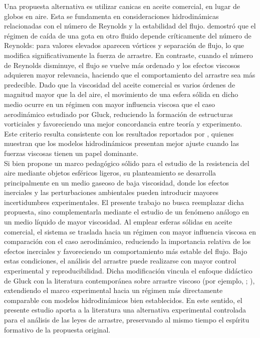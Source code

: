 \documentclass[12pt,a4paper]{config/myConfig}
\begin{document}
\indent Una propuesta alternativa es utilizar canicas en aceite comercial, en lugar de globos en aire. Esta se fundamenta en consideraciones hidrodinámicas relacionadas con el número de Reynolds y la estabilidad del flujo. \citet{Xia2021} demostró que el régimen de caída de una gota en otro fluido depende críticamente del número de Reynolds: para valores elevados aparecen vórtices y separación de flujo, lo que modifica significativamente la fuerza de arrastre. En contraste, cuando el número de Reynolds disminuye, el flujo se vuelve más ordenado y los efectos viscosos adquieren mayor relevancia, haciendo que el comportamiento del arrastre sea más predecible. Dado que la viscosidad del aceite comercial es varios órdenes de magnitud mayor que la del aire, el movimiento de una esfera sólida en dicho medio ocurre en un régimen con mayor influencia viscosa que el caso aerodinámico estudiado por Gluck, reduciendo la formación de estructuras vorticiales y favoreciendo una mejor concordancia entre teoría y experimento. Este criterio resulta consistente con los resultados reportados por \cite{Ruan2021}, quienes muestran que los modelos hidrodinámicos presentan mejor ajuste cuando las fuerzas viscosas tienen un papel dominante. %
\\

Si bien \citeauthor{gluck2003air} propone un marco pedagógico sólido para el estudio de la resistencia del aire mediante objetos esféricos ligeros, su planteamiento se desarrolla principalmente en un medio gaseoso de baja viscosidad, donde los efectos inerciales y las perturbaciones ambientales pueden introducir mayores incertidumbres experimentales. El presente trabajo no busca reemplazar dicha propuesta, sino complementarla mediante el estudio de un fenómeno análogo en un medio líquido de mayor viscosidad. Al emplear esferas sólidas en aceite comercial, el sistema se traslada hacia un régimen con mayor influencia viscosa en comparación con el caso aerodinámico, reduciendo la importancia relativa de los efectos inerciales y favoreciendo un comportamiento más estable del flujo. Bajo estas condiciones, el análisis del arrastre puede realizarse con mayor control experimental y reproducibilidad. Dicha modificación vincula el enfoque didáctico de Gluck con la literatura contemporánea sobre arrastre viscoso (por ejemplo, \citeauthor{Xia2021}; \citeauthor{Ruan2021}), extendiendo el marco experimental hacia un régimen más directamente comparable con modelos hidrodinámicos bien establecidos. En este sentido, el presente estudio aporta a la literatura una alternativa experimental controlada para el análisis de las leyes de arrastre, preservando al mismo tiempo el espíritu formativo de la propuesta original.  %
\end{document}
